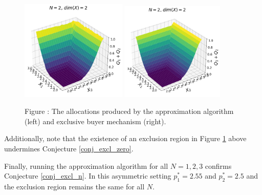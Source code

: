 \begin{figure}[H]
    \begin{center}
    \includegraphics[width=0.45\textwidth]{images/asymmetric_independent_truncnorm.png}
    \includegraphics[width=0.44\textwidth]{images/asymmetric_independent_truncnorm_ebm.png}
    \end{center}
    
    \vspace{1mm}
    \raggedright{\small {\sc Figure \thefig\label{fig:truncnorm_alloc}:} The allocations produced by the approximation algorithm (left) and exclusive buyer mechanism (right).} 
\end{figure}

\noindent Additionally, note that the existence of an exclusion region in Figure \ref{fig:truncnorm_alloc} above undermines Conjecture \ref{conj_excl_zero}.

Finally, running the approximation algorithm for all $N=1,2,3$ confirms Conjecture \ref{conj_excl_n}. In this asymmetric setting $p_1^* = 2.55$ and $p_2^* = 2.5$ and the exclusion region remains the same for all $N$. 


